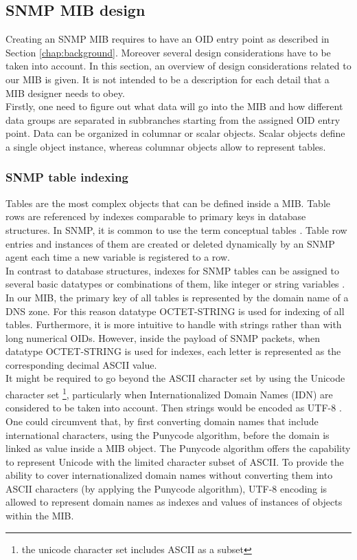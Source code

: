 \subsection{SNMP MIB design}
\label{section:mib-module}
Creating an SNMP MIB requires to have an OID entry point as described in Section \ref{chap:background}. Moreover several design considerations have to be taken into account. In this section, an overview of design considerations related to our MIB is given. It is not intended to be a description for each detail that a MIB designer needs to obey.
\\
Firstly, one need to figure out what data will go into the MIB and how different data groups are separated in subbranches starting from the assigned OID entry point. Data can be organized in columnar or scalar objects. Scalar objects define a single object instance, whereas columnar objects allow to represent tables. 

\subsubsection{SNMP table indexing}

Tables are the most complex objects that can be defined inside a MIB. Table rows are referenced by indexes comparable to primary keys in database structures. In SNMP, it is common to use the term conceptual tables \cite{perkins}. Table row entries and instances of them are created or deleted dynamically by an SNMP agent each time a new variable is registered to a row. 
\\
In contrast to database structures, indexes for SNMP tables can be assigned to several basic datatypes or combinations of them, like integer or string variables \cite{smiv2}.
\\
In our MIB, the primary key of all tables is represented by the domain name of a DNS zone. For this reason datatype OCTET-STRING is used for indexing of all tables. Furthermore, it is more intuitive to handle with strings rather than with long numerical OIDs. However, inside the payload of SNMP packets, when datatype OCTET-STRING is used for indexes, each letter is represented as the corresponding decimal ASCII value. 
\\
It might be required to go beyond the ASCII character set by using the Unicode character set \footnote{the unicode character set includes ASCII as a subset}, particularly when Internationalized Domain Names (IDN) \cite{idn} are considered to be taken into account. Then strings would be encoded as UTF-8 \cite{utf-8}. One could circumvent that, by first converting domain names that include international characters, using the Punycode \cite{punycode} algorithm, before the domain is linked as value inside a MIB object. The Punycode algorithm offers the capability to represent Unicode with the limited character subset of ASCII. To provide the ability to cover internationalized domain names without converting them into ASCII characters (by applying the Punycode algorithm), UTF-8 encoding is allowed to represent domain names as indexes and values of instances of objects within the MIB.

